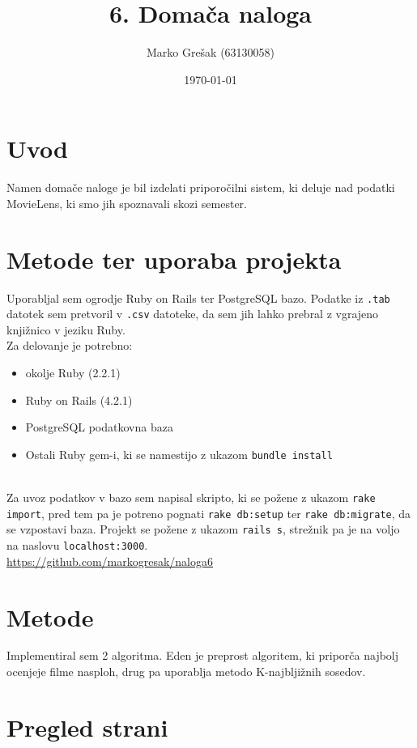 \documentclass[a4paper,11pt]{article}
\title{6. Domača naloga}
\author{Marko Grešak (63130058)}
\date{\today}
\begin{document}
\maketitle

\section{Uvod}

Namen domače naloge je bil izdelati priporočilni sistem, ki deluje nad podatki MovieLens, ki smo jih spoznavali skozi semester.

\section{Metode ter uporaba projekta}

Uporabljal sem ogrodje Ruby on Rails ter PostgreSQL bazo. Podatke iz \texttt{.tab} datotek sem pretvoril v \texttt{.csv} datoteke, da sem jih lahko prebral z vgrajeno knjižnico v jeziku Ruby.
\\
Za delovanje je potrebno:
\begin{itemize}
  \item okolje Ruby (2.2.1)
  \item Ruby on Rails (4.2.1)
  \item PostgreSQL podatkovna baza
  \item Ostali Ruby gem-i, ki se namestijo z ukazom \texttt{bundle install}
\end{itemize}

\\
Za uvoz podatkov v bazo sem napisal skripto, ki se požene z ukazom \texttt{rake import}, pred tem pa je potreno pognati \texttt{rake db:setup} ter \texttt{rake db:migrate}, da se vzpostavi baza. Projekt se požene z ukazom \texttt{rails s}, strežnik pa je na voljo na naslovu \texttt{localhost:3000}.
\\
\href{https://github.com/markogresak/naloga6}{\underline{https://github.com/markogresak/naloga6}}

\section{Metode}

Implementiral sem 2 algoritma. Eden je preprost algoritem, ki priporča najbolj ocenjeje filme nasploh, drug pa uporablja metodo K-najbljižnih sosedov.

\section{Pregled strani}
\end{document}
